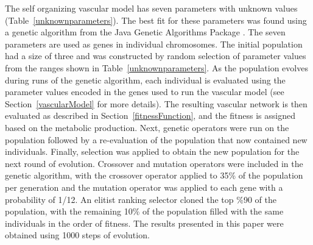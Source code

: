 The self organizing vascular model has seven parameters with unknown values (Table~\ref{unknownparameters}).  The best fit for these parameters was found using a genetic algorithm from the Java Genetic Algorithms Package \cite{cgl:meffert2011genetic}.  The seven parameters are used as genes in individual chromosomes.  The initial population had a size of three and was constructed by random selection of parameter values from the ranges shown in Table~\ref{unknownparameters}. As the population evolves during runs of the genetic algorithm, each individual is evaluated using the parameter values encoded in the genes used to run the vascular model (see Section~\ref{vascularModel} for more details). The resulting vascular network is then evaluated as described in Section~\ref{fitnessFunction}, and the fitness is assigned based on the metabolic production. Next, genetic operators were run on the population followed by a re-evaluation of the population that now contained new individuals. Finally, selection was applied to obtain the new population for the next round of evolution.
Crossover and mutation operators were included in the genetic algorithm, with the crossover operator applied to 35\% of the population per generation and the mutation operator was applied to each gene with a probability of 1/12. An elitist ranking selector cloned the top \%90 of the population, with the remaining 10\% of the population filled with the same individuals in the order of fitness. The results presented in this paper were obtained using 1000 steps of evolution.


